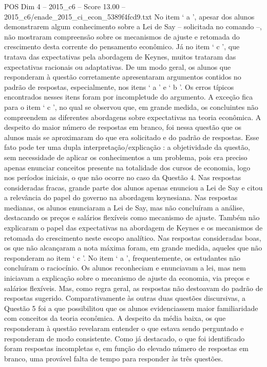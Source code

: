 \begin{textsample}{POS Dim 4 – 2015\_c6 – Score 13.00 – 2015\_c6/enade\_2015\_ci\_econ\_5389f4fcd9.txt}
No item ‘ a ’, apesar dos alunos demonstrarem algum conhecimento sobre a Lei de Say – solicitada no comando –, não mostraram compreensão sobre os mecanismos de ajuste e retomada do crescimento desta corrente do pensamento econômico.
Já no item ‘ c ’, que tratava das expectativas pela abordagem de Keynes, muitos trataram das expectativas racionais ou adaptativas.
De um modo geral, os alunos que responderam à questão corretamente apresentaram argumentos contidos no padrão de respostas, especialmente, nos itens ‘ a ’ e ‘ b ’.
Os erros típicos encontrados nesses itens foram por incompletude do argumento.
A exceção fica para o item ‘ c ’, no qual se observou que, em grande medida, os concluintes não compreendem as diferentes abordagens sobre expectativas na teoria econômica.
A despeito do maior número de respostas em branco, foi nessa questão que os alunos mais se aproximaram do que era solicitado e do padrão de respostas.
Esse fato pode ter uma dupla interpretação/explicação : a objetividade da questão, sem necessidade de aplicar os conhecimentos a um problema, pois era preciso apenas enunciar conceitos presente na totalidade dos cursos de economia, logo nos períodos iniciais, o que não ocorre no caso da Questão 4.
Nas respostas consideradas fracas, grande parte dos alunos apenas enunciou a Lei de Say e citou a relevância do papel do governo na abordagem keynesiana.
Nas respostas medianas, os alunos enunciaram a Lei de Say, mas não concluíram a análise, destacando os preços e salários flexíveis como mecanismo de ajuste.
Também não explicaram o papel das expectativas na abordagem de Keynes e os mecanismos de retomada do crescimento neste escopo analítico.
Nas respostas consideradas boas, os que não alcançaram a nota máxima foram, em grande medida, aqueles que não responderam ao item ‘ c ’.
No item ‘ a ’, frequentemente, os estudantes não concluíram o raciocínio.
Os alunos reconheciam e enunciavam a lei, mas nem iniciavam a explicação sobre o mecanismo de ajuste da economia, via preços e salários flexíveis.
Mas, como regra geral, as respostas não destoavam do padrão de respostas sugerido.
Comparativamente às outras duas questões discursivas, a Questão 5 foi a que possibilitou que os alunos evidenciassem maior familiaridade com conceitos da teoria econômica.
A despeito da média baixa, os que responderam à questão revelaram entender o que estava sendo perguntado e responderam de modo consistente.
Como já destacado, o que foi identificado foram respostas incompletas e, em função do elevado número de respostas em branco, uma provável falta de tempo para responder às três questões.

\end{textsample}
